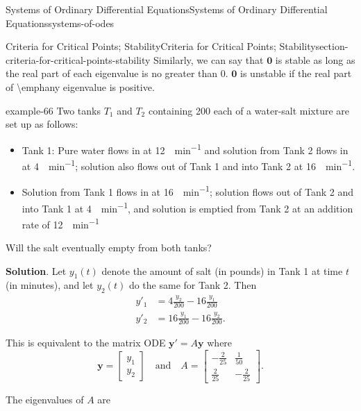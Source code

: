 \documentclass[oneside,10pt,]{book}
\numberwithin{equation}{section}
\renewcommand{\vec}[1]{\mathbf{#1}}
\newcommand{\amp}{&}
\begin{document}
\begin{chapterptx}{Systems of Ordinary Differential Equations}{}{Systems of Ordinary Differential Equations}{}{}{systems-of-odes}
\begin{sectionptx}{Criteria for Critical Points; Stability}{}{Criteria for Critical Points; Stability}{}{}{section-criteria-for-critical-points-stability}
\hypertarget{p-391}{}%
Similarly, we can say that \(\vec{0}\) is stable as long as the real part of each eigenvalue is no greater than \(0\). \(\vec{0}\) is unstable if the real part of \textbackslash{}emph\textbraceleft{}any\textbraceright{} eigenvalue is positive.%
\begin{example}{}{example-66}%
\hypertarget{p-392}{}%
Two tanks \(T_{1}\) and \(T_{2}\) containing \SI{200}{\gallon} each of a water-salt mixture are set up as follows:%
\leavevmode%
\begin{itemize}[label=\textbullet]
\item{}\hypertarget{p-393}{}%
Tank 1: Pure water flows in at \SI{12}{\gallon\per\minute} and solution from Tank 2 flows in at \SI{4}{\gallon\per\minute}; solution also flows out of Tank 1 and into Tank 2 at \SI{16}{\gallon\per\minute}.%
\item{}\hypertarget{p-394}{}%
Solution from Tank 1 flows in at \SI{16}{\gallon\per\minute}; solution flows out of Tank 2 and into Tank 1 at \SI{4}{\gallon\per\minute}, and solution is emptied from Tank 2 at an addition rate of \SI{12}{\gallon\per\minute}%
\end{itemize}
\hypertarget{p-395}{}%
Will the salt eventually empty from both tanks?%
\par\smallskip%
\noindent\textbf{Solution}.\hypertarget{solution-63}{}\quad%
\hypertarget{p-396}{}%
Let \(y_{1}(t)\) denote the amount of salt (in pounds) in Tank 1 at time \(t\) (in minutes), and let \(y_{2}(t)\) do the same for Tank 2. Then%
\begin{align*}
y'_{1}  \amp =  4\frac{y_{2}}{200} - 16\frac{y_{1}}{200}\\
y'_{2}  \amp =  16\frac{y_{1}}{200} - 16\frac{y_{2}}{200}\text{.}
\end{align*}
%
\par
\hypertarget{p-397}{}%
This is equivalent to the matrix ODE \(\vec{y}' = A\vec{y}\) where%
\begin{equation*}
\vec{y} = \begin{bmatrix}y_{1}\\y_{2}\end{bmatrix}\quad\text{and}\quad A = \begin{bmatrix}-\frac{2}{25} \amp  \frac{1}{50} \\ \frac{2}{25} \amp  -\frac{2}{25}\end{bmatrix}.
\end{equation*}
%
\par
\hypertarget{p-398}{}%
The eigenvalues of \(A\) are%
\begin{equation*}

\end{equation*}
\end{example}
\end{sectionptx}
\end{chapterptx}
\end{document}
